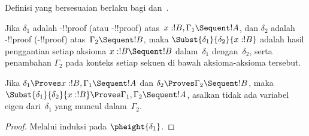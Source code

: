 \documentclass[../../../include/open-logic-section]{subfiles}
\begin{document}
Definisi yang bersesuaian berlaku bagi  dan~.

\begin{defn}
Jika $\delta_1$ adalah -!!{proof} (atau
-!!{proof}) atas~$x:!B, \Gamma_1 \Sequent !A$, dan
$\delta_2$ adalah -!!{proof} (-!!{proof})
atas~$\Gamma_2 \Sequent !B$, maka
$\Subst{\delta_1}{\delta_2}{x:!B}$ adalah hasil penggantian setiap
aksioma $x:!B \Sequent !B$ dalam~$\delta_1$ dengan~$\delta_2$, serta
penambahan $\Gamma_2$ pada konteks setiap sekuen di bawah aksioma-aksioma
tersebut.
\end{defn}

\begin{prop}
Jika $\delta_1 \Proves x:!B, \Gamma_1 \Sequent
!A$ dan $\delta_2 \Proves \Gamma_2 \Sequent !B$, maka
$\Subst{\delta_1}{\delta_2}{x:!B} \Proves \Gamma_1, \Gamma_2 \Sequent
!A$, asalkan tidak ada variabel eigen dari~$\delta_1$ yang muncul
dalam~$\Gamma_2$.
\end{prop}

\begin{proof}
  Melalui induksi pada $\pheight{\delta_1}$.
\end{proof}
\end{document}
